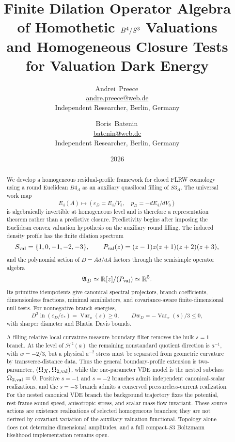 \documentclass[11pt,a4paper]{article}
\title{Finite Dilation Operator Algebra of Homothetic \(\Bfour/\Sthree\) Valuations\\
       and Homogeneous Closure Tests for Valuation Dark Energy}
\author{Andrei~Preece\,\orcidlink{0009-0004-5978-795X}\\
        \small \href{mailto:andre.preece@web.de}{andre.preece@web.de}\\
        \small Independent Researcher, Berlin, Germany
        \and
        Boris~Batenin\,\orcidlink{0009-0000-7027-8583}\\
        \small \href{mailto:batenin@web.de}{batenin@web.de}\\
        \small Independent Researcher, Berlin, Germany}
\date{2026}
\def\Bfour{B4}%
\def\Sthree{S3}%
\def\dd{d}%
\def\Dil{D}%
\numberwithin{equation}{section}
\theoremstyle{definition}
\theoremstyle{plain}
\theoremstyle{remark}
\newcommand{\Sthree}{S^3}
\newcommand{\Bfour}{B^4}
\newcommand{\Dil}{\mathscr{D}}
\newcommand{\Efour}{E_4}
\newcommand{\epsD}{\varepsilon_D}
\newcommand{\pD}{p_D}
\newcommand{\dd}{\mathrm{d}}
\begin{document}
\maketitle



\begin{abstract}
We develop a homogeneous residual-profile framework for closed FLRW
cosmology using a round Euclidean \(\Bfour_A\) as an auxiliary quasilocal
filling of \(\Sthree_A\).  The universal work map
\[
\Efour(A)\mapsto
\left(\epsD=\Efour/V_3,\quad
\pD=-\dd\Efour/\dd V_3\right)
\]
is algebraically invertible at homogeneous level and is therefore a
representation theorem rather than a predictive closure.  Predictivity begins
after imposing the Euclidean convex valuation hypothesis on the auxiliary
round filling.  The induced density profile has the finite dilation spectrum
\[
S_{\rm val}=\{1,0,-1,-2,-3\},
\qquad
P_{\rm val}(z)=(z-1)z(z+1)(z+2)(z+3),
\]
and the polynomial action of \(\Dil=A\dd/\dd A\) factors through the
semisimple operator algebra
\[
\mathfrak A_{\Dil}\simeq \mathbb R[z]/(P_{\rm val})\simeq \mathbb R^5.
\]
Its primitive idempotents give canonical spectral projectors, branch
coefficients, dimensionless fractions, minimal annihilators, and
covariance-aware finite-dimensional null tests.  For nonnegative branch
energies,
\[
\Dil^2\ln(\epsD/\varepsilon_*)=\operatorname{Var}_\pi(s)\ge0,
\qquad
\Dil w_D=-\operatorname{Var}_\pi(s)/3\le0,
\]
with sharper diameter and Bhatia--Davis bounds.

A filling-relative local curvature-measure boundary filter removes the bulk
\(s=1\) branch.  At the level of \(\mathcal H^2(a)\) the remaining nonstandard quotient
direction is \(a^{-1}\), with \(w=-2/3\), but a physical \(a^{-2}\) stress must
be separated from geometric curvature by transverse-distance data.  Thus the
general boundary-profile extension is two-parameter,
\((\Omega_X,\Omega_{2,\rm val})\), while the one-parameter VDE model is the
nested subclass \(\Omega_{2,\rm val}=0\).
Positive \(s=-1\) and \(s=-2\) branches admit independent canonical-scalar
realizations, and the \(s=-3\) branch admits a conserved pressureless-current
realization.  For the nested canonical VDE branch the background trajectory
fixes the potential, rest-frame sound speed, anisotropic stress, and scalar
mass-flow invariant.  These source actions are existence realizations of
selected homogeneous branches; they are not derived by covariant variation of
the auxiliary valuation functional.  Topology alone does not determine
dimensional amplitudes, and a full compact-\(\Sthree\) Boltzmann likelihood
implementation remains open.
\end{abstract}
\end{document}
